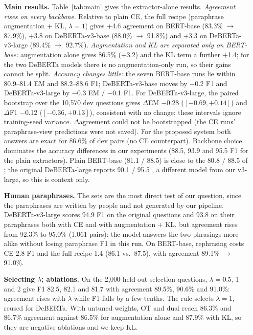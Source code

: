 \documentclass[11pt]{article}
\begin{document}
\textbf{Main results.} Table~\ref{tab:main} gives the extractor-alone results. \emph{Agreement rises on every backbone.} Relative to plain CE, the full recipe (paraphrase augmentation + KL, $\lambda=1$) gives +4.6 agreement on BERT-base (83.3\% $\rightarrow$ 87.9\%), +3.8 on DeBERTa-v3-base (88.0\% $\rightarrow$ 91.8\%) and +3.3 on DeBERTa-v3-large (89.4\% $\rightarrow$ 92.7\%). \emph{Augmentation and KL are separated only on BERT-base:} augmentation alone gives 86.5\% (+3.2) and the KL term a further +1.4; for the two DeBERTa models there is no augmentation-only run, so their gains cannot be split. \emph{Accuracy changes little:} the seven BERT-base runs lie within 80.9--81.4 EM and 88.2--88.6 F1; DeBERTa-v3-base moves by $-$0.2 F1 and DeBERTa-v3-large by $-$0.3 EM / $-$0.1 F1. For DeBERTa-v3-large, the paired bootstrap over the 10,570 dev questions gives $\Delta$EM $-$0.28 ($[-0.69,+0.14]$) and $\Delta$F1 $-$0.12 ($[-0.36,+0.13]$), consistent with no change; these intervals ignore training-seed variance. $\Delta$agreement could not be bootstrapped (the CE runs' paraphrase-view predictions were not saved). For the proposed system both answers are exact for 86.6\% of dev pairs (no CE counterpart). Backbone choice dominates the accuracy differences in our experiments (88.5, 93.9 and 95.5 F1 for the plain extractors). Plain BERT-base (81.1 / 88.5) is close to the 80.8 / 88.5 of \citet{devlin2019bert}; the original DeBERTa-large reports 90.1 / 95.5 \citep{he2021deberta}, a different model from our v3-large, so this is context only.

\textbf{Human paraphrases.} The \citet{gan2019improving} sets are the most direct test of our question, since the paraphrases are written by people and not generated by our pipeline. DeBERTa-v3-large scores 94.9 F1 on the original questions and 93.8 on their paraphrases both with CE and with augmentation + KL, but agreement rises from 92.3\% to 95.0\% (1,061 pairs): the model answers the two phrasings more alike without losing paraphrase F1 in this run. On BERT-base, rephrasing costs CE 2.8 F1 and the full recipe 1.4 (86.1 vs.\ 87.5), with agreement 89.1\% $\rightarrow$ 91.0\%.

\textbf{Selecting $\lambda$; ablations.} On the 2,000 held-out selection questions, $\lambda=0.5$, 1 and 2 give F1 82.5, 82.1 and 81.7 with agreement 89.5\%, 90.6\% and 91.0\%: agreement rises with $\lambda$ while F1 falls by a few tenths. The rule selects $\lambda=1$, reused for DeBERTa. With untuned weights, OT and dual reach 86.3\% and 86.7\% agreement against 86.5\% for augmentation alone and 87.9\% with KL, so they are negative ablations and we keep KL.
\end{document}
